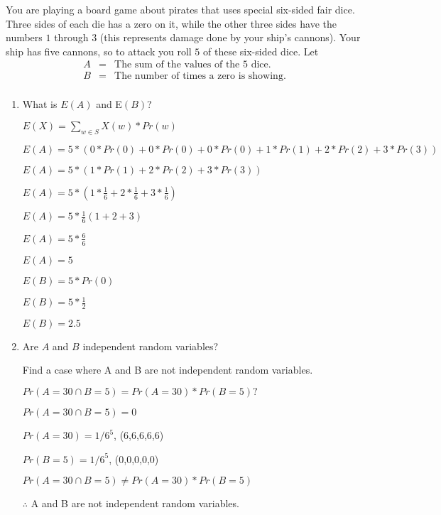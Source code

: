 \documentclass[12pt]{article}
\newcounter{ques}
\newenvironment{question}{\stepcounter{ques}{\noindent\bf Question \arabic{ques}:}}{\vspace{5mm}}
\begin{document}
\begin{question}
	You are playing a board game about pirates that uses special six-sided fair dice. Three sides of each die has a zero on it, while the other three sides have the numbers $1$ through $3$ (this represents damage done by your ship's cannons). Your ship has five cannons, so to attack you roll $5$ of these six-sided dice.  Let 
	\begin{eqnarray*} 
		A & = & \mbox{The sum of the values of the $5$ dice.} \\ 
		B & = & \mbox{The number of times a zero is showing.} \\ 
	\end{eqnarray*} 
	
	\begin{enumerate}
		\item What is $E(A)$ and E$(B)$?
		
		$E(X) = \sum_{w \in S} X(w) * Pr(w)$

		$E(A) = 5 * (0 * Pr(0) + 0 * Pr(0) + 0 * Pr(0) + 1 * Pr(1) + 2 * Pr(2) + 3 * Pr(3))$
	
		$E(A) = 5 * (1 * Pr(1) + 2 * Pr(2) + 3 * Pr(3))$

		$E(A) = 5 * (1 * \frac{1}{6} + 2 * \frac{1}{6} + 3 * \frac{1}{6})$

		$E(A) = 5 * \frac{1}{6} (1 + 2 + 3)$

		$E(A) = 5 * \frac{6}{6}$
		
		$E(A) = 5$

		$E(B) = 5 * Pr(0)$

		$E(B) = 5 * \frac{1}{2}$
		
		$E(B) = 2.5$

		\item Are $A$ and $B$ independent random variables?
		
		Find a case where A and B are not independent random variables.

		$Pr(A = 30 \cap B = 5) = Pr(A = 30) * Pr(B = 5)?$

		$Pr(A = 30 \cap B = 5) = 0$

		$Pr(A = 30) = 1/6^5$, (6,6,6,6,6)

		$Pr(B = 5) = 1/6^5$, (0,0,0,0,0)

		$Pr(A = 30 \cap B = 5) \neq Pr(A = 30) * Pr(B = 5)$

		$\therefore$ A and B are not independent random variables.

	\end{enumerate}
\end{question}
\end{document}
